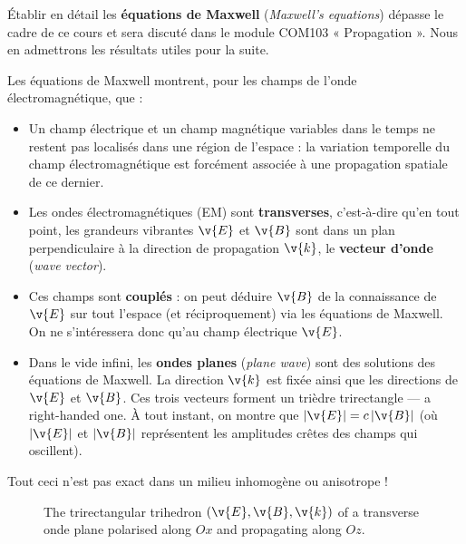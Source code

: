 Établir en détail les \textbf{équations de Maxwell} (\textit{Maxwell's
equations}) dépasse le cadre de ce cours et sera discuté dans le module COM103
« Propagation ». Nous en admettrons les résultats utiles pour la suite.

\begin{prop}
  Les équations de Maxwell montrent, pour les champs de l'onde
  électromagnétique, que :
  \begin{itemize}
    \item Un champ électrique et un champ magnétique variables dans le temps ne
      restent pas localisés dans une région de l'espace : la variation
      temporelle du champ électromagnétique est forcément associée à une
      propagation spatiale de ce dernier.
    \item Les ondes électromagnétiques (EM) sont \textbf{transverses},
      c'est-à-dire qu'en tout point, les grandeurs vibrantes $\v{E}$ et
      $\v{B}$ sont dans un plan perpendiculaire à la direction de propagation
      $\v{k}$, le \textbf{vecteur d'onde} (\textit{wave vector}).
    \item Ces champs sont \textbf{couplés} : on peut déduire $\v{B}$ de la
      connaissance de $\v{E}$ sur tout l'espace (et réciproquement) via les
      équations de Maxwell. On ne s'intéressera donc qu'au champ électrique
      $\v{E}$.
    \item Dans le vide infini, les \textbf{ondes planes} (\textit{plane wave})
      sont des solutions des équations de Maxwell. La direction $\v{k}$ est
      fixée ainsi que les directions de $\v{E}$ et $\v{B}$. Ces trois vecteurs
      forment un trièdre trirectangle --- a right-handed one. À tout instant,
      on montre que $|\v{E}|=c\,|\v{B}|$ (où $|\v{E}|$ et $|\v{B}|$
      représentent les amplitudes crêtes des champs qui oscillent).
  \end{itemize}
\end{prop}

\begin{remark}
  Tout ceci n'est pas exact dans un milieu inhomogène ou anisotrope !
\end{remark}

\begin{figure}[h!]
  \centering
  \caption*{\small The trirectangular trihedron $(\v{E},\v{B},\v{k})$ of a
  transverse onde plane polarised along $Ox$ and propagating along $Oz$.}
\end{figure}

